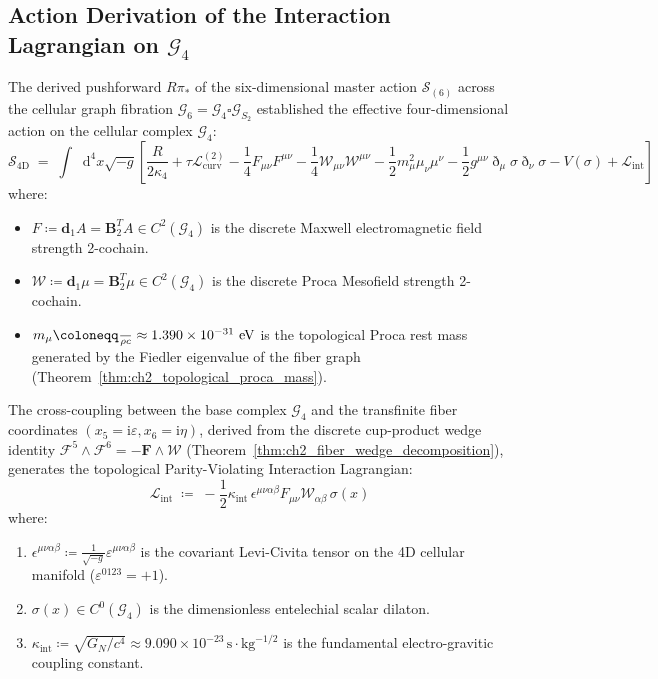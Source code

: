 \documentclass[
    12pt,
    a4paper,
    headings=normal,
    twoside=false,
    open=any,
    parskip=half
]{scrbook}
\let\hbar\relax
\newcommand{\ethop}{\eth}
\newcommand{\diff}{\mathop{}\!\mathrm{d}}
\newcommand{\iu}{\mathrm{i}}
\begin{document}
\subsection{Action Derivation of the Interaction Lagrangian on $\mathcal{G}_4$}

The derived pushforward $R\pi_*$ of the six-dimensional master action $\mathcal{S}_{(6)}$ across the cellular graph fibration $\mathcal{G}_6 = \mathcal{G}_4 \square \mathcal{G}_{S_2}$ established the effective four-dimensional action on the cellular complex $\mathcal{G}_4$:
\begin{equation}
\mathcal{S}_{4\text{D}} \;=\; \int \diff^4 x \sqrt{-g} \left[ \frac{R}{2\kappa_4} + \tau \mathcal{L}_{\text{curv}}^{(2)} - \frac{1}{4} F_{\mu\nu}F^{\mu\nu} - \frac{1}{4} \mathcal{W}_{\mu\nu}\mathcal{W}^{\mu\nu} - \frac{1}{2} m_\mu^2 \mu_\nu \mu^\nu - \frac{1}{2} g^{\mu\nu}\ethop_\mu\sigma\ethop_\nu\sigma - V(\sigma) + \mathcal{L}_{\text{int}} \right]
\label{eq:ch6_action_recap_master}
\end{equation}
where:
\begin{itemize}[noitemsep]
    \item $F \coloneqq \mathbf{d}_1 A = \mathbf{B}_2^T A \in C^2(\mathcal{G}_4)$ is the discrete Maxwell electromagnetic field strength 2-cochain.
    \item $\mathcal{W} \coloneqq \mathbf{d}_1 \mu = \mathbf{B}_2^T \mu \in C^2(\mathcal{G}_4)$ is the discrete Proca Mesofield strength 2-cochain.
    \item $m_\mu \coloneqq \frac{\hbar}{\rho c} \approx 1.390 \times 10^{-31}\text{ eV}$ is the topological Proca rest mass generated by the Fiedler eigenvalue of the fiber graph (Theorem~\ref{thm:ch2_topological_proca_mass}).
\end{itemize}

The cross-coupling between the base complex $\mathcal{G}_4$ and the transfinite fiber coordinates $(x_5 = \iu\varepsilon, x_6 = \iu\eta)$, derived from the discrete cup-product wedge identity $\mathcal{F}^5 \wedge \mathcal{F}^6 = -\mathbf{F} \wedge \boldsymbol{\mathcal{W}}$ (Theorem~\ref{thm:ch2_fiber_wedge_decomposition}), generates the topological Parity-Violating Interaction Lagrangian:
\begin{equation}
\mathcal{L}_{\text{int}} \;\coloneqq\; -\frac{1}{2} \kappa_{\text{int}} \, \epsilon^{\mu\nu\alpha\beta} F_{\mu\nu} \mathcal{W}_{\alpha\beta} \, \sigma(x)
\label{eq:ch6_interaction_lagrangian_def}
\end{equation}
where:
\begin{enumerate}[label=(\alph*), noitemsep]
    \item $\epsilon^{\mu\nu\alpha\beta} \coloneqq \frac{1}{\sqrt{-g}} \varepsilon^{\mu\nu\alpha\beta}$ is the covariant Levi-Civita tensor on the 4D cellular manifold ($\varepsilon^{0123} = +1$).
    \item $\sigma(x) \in C^0(\mathcal{G}_4)$ is the dimensionless entelechial scalar dilaton.
    \item $\kappa_{\text{int}} \coloneqq \sqrt{G_N / c^4} \approx 9.090 \times 10^{-23}\,\text{s}\cdot\text{kg}^{-1/2}$ is the fundamental electro-gravitic coupling constant.
\end{enumerate}
\end{document}
